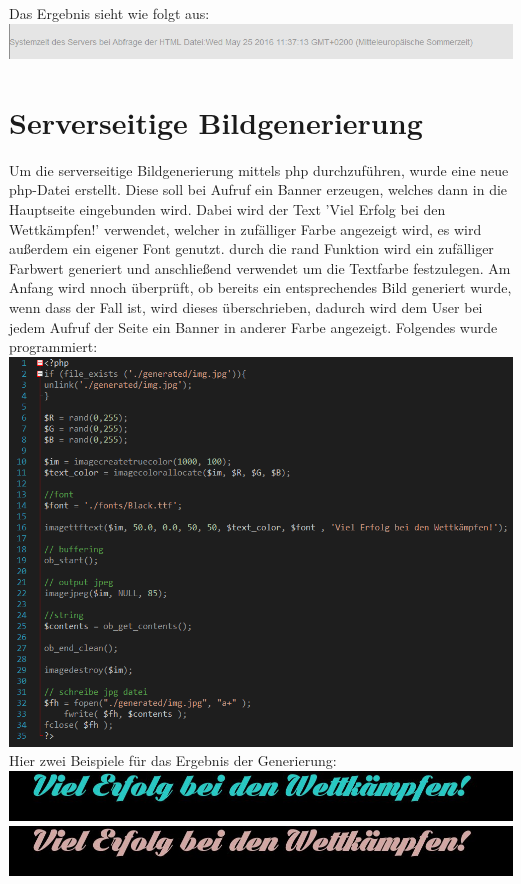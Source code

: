 \newline
Das Ergebnis sieht wie folgt aus:
\newline
\includegraphics[width=1\textwidth]{img/vincent/abb17.png}
\newline

\section{Serverseitige Bildgenerierung}
Um die serverseitige Bildgenerierung mittels php durchzuf\"uhren, wurde eine neue php-Datei erstellt. Diese soll bei Aufruf ein Banner erzeugen, welches dann in die Hauptseite eingebunden wird. Dabei wird der Text 'Viel Erfolg bei den Wettk\"ampfen!' verwendet, welcher in zuf\"alliger Farbe angezeigt wird, es wird außerdem ein eigener Font genutzt. durch die rand Funktion wird ein zuf\"alliger Farbwert generiert und anschließend verwendet um die Textfarbe festzulegen. Am Anfang wird nnoch \"uberpr\"uft, ob bereits ein entsprechendes Bild generiert wurde, wenn dass der Fall ist, wird dieses \"uberschrieben, dadurch wird dem User bei jedem Aufruf der Seite ein Banner in anderer Farbe angezeigt. Folgendes wurde programmiert:
\newline
\includegraphics[width=1\textwidth]{img/vincent/abb10.png}
\newline
Hier zwei Beispiele f\"ur das Ergebnis der Generierung:
\newline
\includegraphics[width=1\textwidth]{img/vincent/img.jpg}
\includegraphics[width=1\textwidth]{img/vincent/img2.jpg}
\newline

